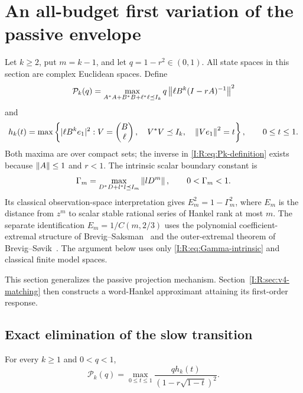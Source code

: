 \section{An all-budget first variation of the passive envelope}
\label{I:R:sec:all-budget-response}

Let $k\ge2$, put $m=k-1$, and let $q=1-r^2\in(0,1)$.  All state
spaces in this section are complex Euclidean spaces.  Define
\begin{equation}
 \mathcal P_k(q)=
 \max_{A^*A+B^*B+\ell^*\ell\preceq I_k}
 q\left\lVert\ell B^k(I-rA)^{-1}\right\rVert^2
 \label{I:R:eq:Pk-definition}
\end{equation}
and
\begin{equation}
 h_k(t)=\max\left\{|\ell B^ke_1|^2:
 V=\begin{pmatrix}B\\ \ell\end{pmatrix},\quad
 V^*V\preceq I_k,\quad \left\lVert Ve_1\right\rVert^2=t\right\},
 \qquad 0\le t\le1.
 \label{I:R:eq:hk-definition}
\end{equation}
Both maxima are over compact sets; the inverse in
\eqref{I:R:eq:Pk-definition} exists because $\left\lVert A\right\rVert\le1$ and $r<1$.
The intrinsic scalar boundary constant is
\begin{equation}
 \Gamma_m=\max_{D^*D+l^*l\preceq I_m}\left\lVert lD^m\right\rVert,
 \qquad 0<\Gamma_m<1.
 \label{I:R:eq:Gamma-intrinsic}
\end{equation}
Its classical observation-space interpretation gives
$E_m^2=1-\Gamma_m^2$, where $E_m$ is the distance from $z^m$ to scalar
stable rational series of Hankel rank at most $m$.  The separate
identification $E_m=1/C(m,2/3)$ uses the polynomial coefficient-extremal
structure of Brevig--Saksman~\cite{brevig2020} and the outer-extremal theorem
of Brevig--S\o vik~\cite{outer2026}.  The argument below uses only
\eqref{I:R:eq:Gamma-intrinsic} and classical finite model spaces.

This section generalizes the passive projection mechanism.
Section~\ref{I:R:sec:v4-matching} then constructs a word-Hankel
approximant attaining its first-order response.

\subsection{Exact elimination of the slow transition}

\begin{proposition}
\label{I:R:prop:allk-eliminate-A}
For every $k\ge1$ and $0<q<1$,
\begin{equation}
 \boxed{\displaystyle
 \mathcal P_k(q)=\max_{0\le t\le1}
 \frac{q h_k(t)}{(1-r\sqrt{1-t})^2}.}
 \label{I:R:eq:allk-elimination}
\end{equation}
\end{proposition}


